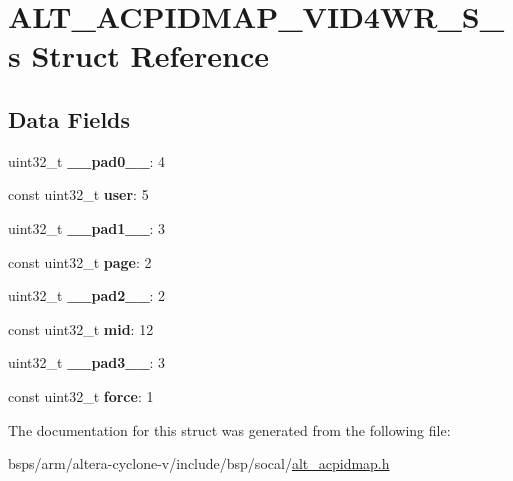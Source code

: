 \hypertarget{structALT__ACPIDMAP__VID4WR__S__s}{}\section{A\+L\+T\+\_\+\+A\+C\+P\+I\+D\+M\+A\+P\+\_\+\+V\+I\+D4\+W\+R\+\_\+\+S\+\_\+s Struct Reference}
\label{structALT__ACPIDMAP__VID4WR__S__s}
\subsection*{Data Fields}
\begin{DoxyCompactItemize}
\item 
\mbox{\label{structALT__ACPIDMAP__VID4WR__S__s_a2fedd581662368a458d425d2fe16eac2}} 
uint32\+\_\+t {\bfseries \+\_\+\+\_\+pad0\+\_\+\+\_\+}\+: 4
\item 
\mbox{\label{structALT__ACPIDMAP__VID4WR__S__s_a1da0921bba4ca7ca15fd91b3a127b501}} 
const uint32\+\_\+t {\bfseries user}\+: 5
\item 
\mbox{\label{structALT__ACPIDMAP__VID4WR__S__s_a6e74a05564c2463a8117f76a5f3f58f8}} 
uint32\+\_\+t {\bfseries \+\_\+\+\_\+pad1\+\_\+\+\_\+}\+: 3
\item 
\mbox{\label{structALT__ACPIDMAP__VID4WR__S__s_aa2b8550a9844c3e9e5c14ab5653cf7ca}} 
const uint32\+\_\+t {\bfseries page}\+: 2
\item 
\mbox{\label{structALT__ACPIDMAP__VID4WR__S__s_a0e065150c8451170769b53f6ac186db1}} 
uint32\+\_\+t {\bfseries \+\_\+\+\_\+pad2\+\_\+\+\_\+}\+: 2
\item 
\mbox{\label{structALT__ACPIDMAP__VID4WR__S__s_ad9ecc08e920a087c78a1232970156b62}} 
const uint32\+\_\+t {\bfseries mid}\+: 12
\item 
\mbox{\label{structALT__ACPIDMAP__VID4WR__S__s_a74a18a41bb18be19a4e48d473455a7ca}} 
uint32\+\_\+t {\bfseries \+\_\+\+\_\+pad3\+\_\+\+\_\+}\+: 3
\item 
\mbox{\label{structALT__ACPIDMAP__VID4WR__S__s_a73312954b0cadbf6bf5f10a7dd8ca492}} 
const uint32\+\_\+t {\bfseries force}\+: 1
\end{DoxyCompactItemize}


The documentation for this struct was generated from the following file\+:\begin{DoxyCompactItemize}
\item 
bsps/arm/altera-\/cyclone-\/v/include/bsp/socal/\mbox{\hyperlink{alt__acpidmap_8h}{alt\+\_\+acpidmap.\+h}}\end{DoxyCompactItemize}
